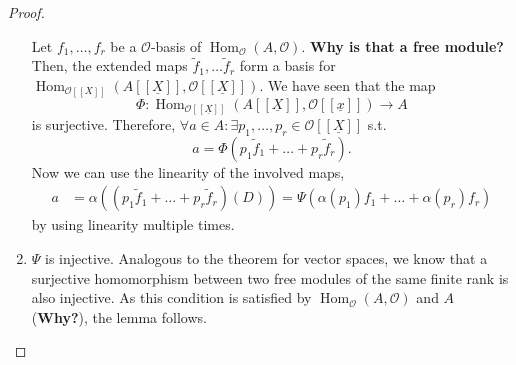 \documentclass{article}
\theoremstyle{plain}%
\theoremstyle{definition}
\theoremstyle{remark}
\renewcommand{\hom}{\operatorname{Hom}}
\begin{document}
\begin{proof}
\begin{enumerate}
        Let \(f_1, \dots, f_r\) be a \(\mathcal{O}\)-basis of \(\hom_\mathcal{O}(A, \mathcal{O})\). 
        \textbf{Why is that a free module?}
        Then, the extended maps \(\tilde f_1, \dots \tilde f_r\) form a basis for
        \(\hom_{\mathcal{O}[[X]]}(A[[\underline{X}]], \mathcal{O}[[\underline{X}]]).\)
        We have seen that the map 
        \[
            \Phi\colon \hom_{\mathcal{O}[[\underline{X}]]}(A[[\underline{X}]], \mathcal{O}[[\underline{x}]]) \to A
        \] 
        is surjective.
        Therefore, \(\forall a \in A\colon \exists p_1, \dots, p_r \in \mathcal{O}[[\underline{X}]]\) s.t.
        \[
            a = \Phi(p_1 \tilde f_1 + \dots + p_r \tilde f_r).
        \]
        Now we can use the linearity of the involved maps,
        \begin{align*} 
                a &= \alpha((p_1 \tilde f_1 + \dots + p_r \tilde f_r)(D))
                = \Psi(\alpha(p_1) f_1 + \dots + \alpha(p_r) f_r)
        \end{align*}
        by using linearity multiple times.%
        \item \(\Psi\) is injective.
        Analogous to the theorem for vector spaces, we know that a surjective homomorphism between two free modules 
        of the same finite rank is also injective.
        As this condition is satisfied by \(\hom_\mathcal{O}(A, \mathcal{O})\) and \(A\) (\textbf{Why?}), 
        the lemma follows.
    \end{enumerate}
\end{proof}

\printbibliography
\end{document}
